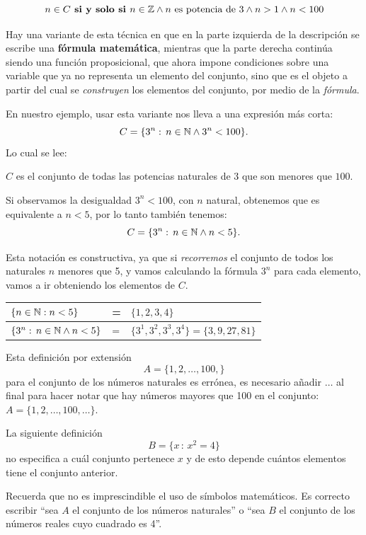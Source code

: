 $$n\in C \textbf{ si y solo si } n\in \mathbb{Z}\wedge n \mbox{ es potencia de } 3\wedge n > 1 \wedge n < 100$$


Hay una variante de esta técnica en que 
en la parte izquierda de la descripción 
se escribe una \textbf{fórmula matemática}, mientras que la parte derecha 
contin\'ua siendo una función proposicional, 
que ahora impone condiciones sobre una variable 
que ya no representa un elemento del conjunto, sino 
que es el objeto a partir del cual se {\em construyen} 
los elementos del conjunto, por medio de la {\em fórmula}.

En nuestro ejemplo, usar esta variante nos lleva a una expresión más corta:
$$C=\{3^n:\, n\in\mathbb{N}\wedge  3^n<100\}.$$
Lo cual se lee:
\begin{center}
	$C$ es el conjunto de todas las potencias naturales 
	de 3 que son menores que $100$.
\end{center}

Si observamos la desigualdad $3^n<100$, con $n$ natural, obtenemos que es equivalente a $n<5$, por lo tanto también tenemos:
$$C=\{3^n:\, n\in\mathbb{N}\wedge  n<5\}.$$

Esta notación es constructiva, ya que si {\em recorremos} el conjunto de todos los naturales $n$ menores que 5, y vamos calculando la fórmula $3^n$ para cada elemento, vamos a ir obteniendo los elementos de $C$.

\begin{center}
\begin{tabular}{|lll|}\hline
	$\{ n\in\mathbb{N}:  n<5\}$&=&$\{1,2,3,4\}$\\\hline
	$\{3^n:\, n\in\mathbb{N}\wedge  n<5\}$&=&$\{3^1,3^2,3^3,3^4\}=\{3,9,27,81\}$\\\hline
\end{tabular}
\end{center}





\bigskip 



\begin{rem}	
	Esta definici\'on por extensi\'on
	\[
		A = \{1,2,\ldots,100,\}
	\]
	para el conjunto de los n\'umeros naturales es err\'onea, es necesario
	a\~nadir $\ldots$ al final para hacer notar que hay n\'umeros mayores que
	100 en el conjunto: 		$A = \{1,2,\ldots,100,\ldots\}.$

	
	La siguiente definici\'on
	\[
		B = \{x\,:\, x^2 = 4\}
	\]
	no especifica a cu\'al conjunto pertenece $x$ y de esto depende
	cu\'antos elementos tiene el conjunto anterior. 
	
	Recuerda que no es imprescindible el uso de s\'imbolos matem\'aticos.
	Es correcto escribir ``sea $A$ el conjunto de los n\'umeros naturales''
	o ``sea $B$ el conjunto de los n\'umeros reales cuyo cuadrado es 4''.
\end{rem}

